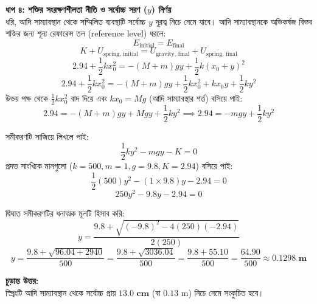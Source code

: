 \documentclass[12pt, a4paper]{article}
\begin{document}
\begin{tcolorbox}[solutionbox={সমাধান (Solution)}]
\begin{center}
\end{center}
\vspace{1em}

\noindent
\textbf{ধাপ ৪: শক্তির সংরক্ষণশীলতা নীতি ও সর্বোচ্চ সরণ ($y$) নির্ণয়} \\
ধরি, আদি সাম্যাবস্থান থেকে সম্মিলিত ব্যবস্থাটি সর্বোচ্চ $y$ দূরত্ব নিচে নেমে যাবে। আদি সাম্যাবস্থানকে অভিকর্ষজ বিভব শক্তির জন্য শূন্য রেফারেন্স তল (reference level) ধরলে:
$$E_{\text{initial}} = E_{\text{final}}$$ 
$$K + U_{\text{spring, initial}} = U_{\text{gravity, final}} + U_{\text{spring, final}}$$ 
$$2.94 + \frac{1}{2} k x_0^2 = -(M + m)g y + \frac{1}{2} k (x_0 + y)^2$$ 
$$2.94 + \frac{1}{2} k x_0^2 = -(M + m)g y + \frac{1}{2} k x_0^2 + k x_0 y + \frac{1}{2} k y^2$$
উভয় পক্ষ থেকে $\frac{1}{2} k x_0^2$ বাদ দিয়ে এবং $k x_0 = M g$ (আদি সাম্যাবস্থার শর্ত) বসিয়ে পাই: 
$$2.94 = -(M + m)g y + M g y + \frac{1}{2} k y^2 \implies 2.94 = -m g y + \frac{1}{2} k y^2$$

সমীকরণটি সাজিয়ে লিখলে পাই:
$$\frac{1}{2} k y^2 - m g y - K = 0$$
প্রদত্ত সাংখ্যিক মানগুলো ($k=500, m=1, g=9.8, K=2.94$) বসিয়ে পাই: 
$$\frac{1}{2} (500) y^2 - (1 \times 9.8) y - 2.94 = 0$$ 
$$250 y^2 - 9.8 y - 2.94 = 0$$

দ্বিঘাত সমীকরণটির ধনাত্মক মূলটি হিসাব করি: 
$$y = \frac{9.8 + \sqrt{(-9.8)^2 - 4(250)(-2.94)}}{2(250)}$$ 
$$y = \frac{9.8 + \sqrt{96.04 + 2940}}{500} = \frac{9.8 + \sqrt{3036.04}}{500} = \frac{9.8 + 55.10}{500} = \frac{64.90}{500} \approx \mathbf{0.1298\text{ m}}$$

\vspace{1em}
\begin{tcolorbox}[answerbox]
\textbf{চূড়ান্ত উত্তর:} \\
স্প্রিংটি আদি সাম্যাবস্থান থেকে সর্বোচ্চ প্রায় $\mathbf{13.0\text{ cm}}$ (বা $0.13\text{ m}$) নিচে নেমে সংকুচিত হবে।
\end{tcolorbox}
\end{tcolorbox}
\end{document}
